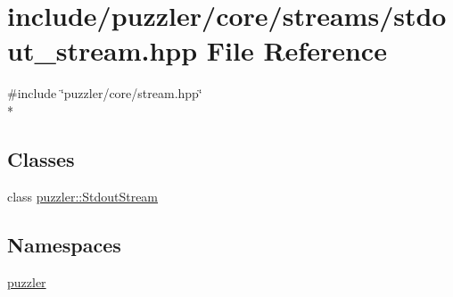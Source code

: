 \hypertarget{a00126}{}\section{include/puzzler/core/streams/stdout\+\_\+stream.hpp File Reference}
\label{a00126}
{\ttfamily \#include \char`\"{}puzzler/core/stream.\+hpp\char`\"{}}\\*
\subsection*{Classes}
\begin{DoxyCompactItemize}
\item 
class \hyperlink{a00030}{puzzler\+::\+Stdout\+Stream}
\end{DoxyCompactItemize}
\subsection*{Namespaces}
\begin{DoxyCompactItemize}
\item 
 \hyperlink{a00145}{puzzler}
\end{DoxyCompactItemize}
